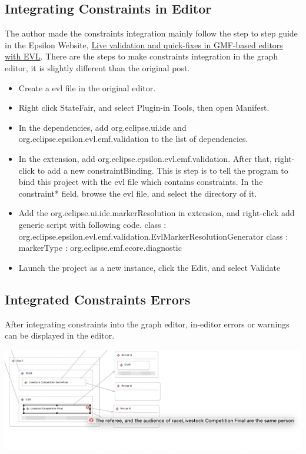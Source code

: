 \documentclass[12pt]{article}
\begin{document}
\subsection{Integrating Constraints in Editor}
The author made the constraints integration mainly follow the step to step guide in the Epsilon Website, 
\href{https://www.eclipse.org/epsilon/doc/articles/evl-gmf-integration/}{Live validation and quick-fixes in GMF-based editors with EVL}.
There are the steps to make constraints integration in the graph editor, it is slightly different than the original post.
\begin{itemize}
    \item Create a evl file in the original editor.
    \item Right click StateFair, and select Plugin-in Tools, then open Manifest.
    \item In the dependencies, add org.eclipse.ui.ide and org.eclipse.epsilon.evl.emf.validation to the list of dependencies.
    \item In the extension, add org.eclipse.epsilon.evl.emf.validation. After that, right-click to add a new constraintBinding. 
    This is step is to tell the program to bind this project with the evl file which contains constraints. In the constraint* 
    field, browse the evl file, and select the directory of it. 
    \item Add the org.eclipse.ui.ide.markerResolution in extension, and right-click add generic script with following code.
    \newline class : org.eclipse.epsilon.evl.emf.validation.EvlMarkerResolutionGenerator
    \newline class : markerType : org.eclipse.emf.ecore.diagnostic
    \item Launch the project as a new instance, click the Edit, and select Validate 
\end{itemize}

\subsection{Integrated Constraints Errors}
After integrating constraints into the graph editor, in-editor errors or warnings can be displayed in the editor.

\includegraphics[scale = 0.6]{img/graph-editor-error1}
\end{document}
